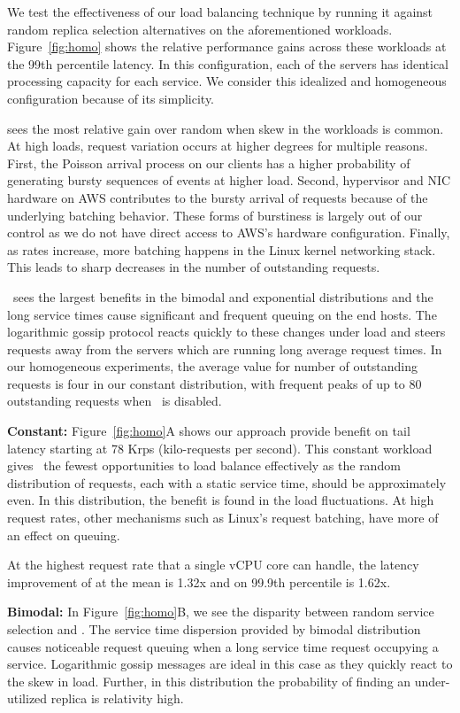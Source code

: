 We test the effectiveness of our load balancing technique by running it against
random replica selection alternatives on the aforementioned workloads.
Figure~\ref{fig:homo} shows the relative performance gains across these
workloads at the 99th percentile latency. In this configuration, each of the
servers has identical processing capacity for each service.  We consider this
idealized and homogeneous configuration because of its simplicity.

\systemname sees the most relative gain over random when skew in the workloads
is common. At high loads, request variation occurs at higher degrees for
multiple reasons. First, the Poisson arrival process on our clients has a
higher probability of generating bursty sequences of events at higher load.
Second, hypervisor and NIC hardware on AWS contributes to the bursty arrival of
requests because of the underlying batching behavior.  These forms of
burstiness is largely out of our control as we do not have direct access to
AWS's hardware configuration.  Finally, as rates increase, more batching
happens in the Linux kernel networking stack. This leads to sharp decreases in
the number of outstanding requests. 

\toolname\ sees the largest benefits in the bimodal and exponential
distributions and the long service times cause significant and frequent queuing
on the end hosts. The logarithmic gossip protocol reacts quickly to these
changes under load and steers requests away from the servers which are running
long average request times.  In our homogeneous experiments, the average value
for number of outstanding requests is four in our constant distribution, with
frequent peaks of up to 80 outstanding requests when \toolname\ is disabled.

\noindent\textbf{Constant:} Figure~\ref{fig:homo}A shows our approach provide benefit
on tail latency starting at 78 Krps (kilo-requests per second).  This constant
workload gives \toolname\ the fewest opportunities to load balance effectively
as the random distribution of requests, each with a static service time, should
be approximately even. In this distribution, the benefit is found in the load
fluctuations. At high request rates, other mechanisms such as Linux's request
batching, have more of an effect on queuing.

At the highest request rate that a single vCPU core can handle, the latency
improvement of \systemname at the mean is 1.32x and on 99.9th percentile is
1.62x.

\noindent\textbf{Bimodal:} In Figure~\ref{fig:homo}B, we see the disparity between
random service selection and \toolname. The service time dispersion provided by
bimodal distribution causes noticeable request queuing when a long service time
request occupying a service.  Logarithmic gossip messages are ideal in this
case as they quickly react to the skew in load.  Further, in this distribution
the probability of finding an under-utilized replica is relativity high.  

